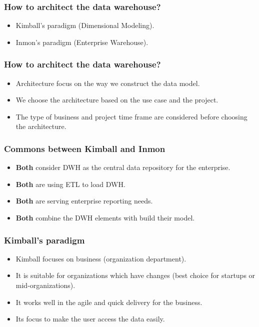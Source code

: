 \begin{frame}
	\frametitle{How to architect the data warehouse?}
	\begin{itemize}[<+->]
		\item Kimball's paradigm (Dimensional Modeling).
		\item Inmon's paradigm (Enterprise Warehouse).
	\end{itemize}
\end{frame}
\begin{frame}
	\frametitle{How to architect the data warehouse? }
	\begin{itemize}[<+->]
	\item Architecture focus on the way we construct the data model.
	\item We choose the architecture based on the use case and the project.
	\item The type of business and project time frame are considered before choosing the architecture. 
\end{itemize}
	
\end{frame}
\begin{frame}
	\frametitle{Commons between Kimball and Inmon}
		\begin{itemize}[<+->]
		\item \textbf{Both} consider DWH as the central data repository for the enterprise.
		\item \textbf{Both} are using ETL to load DWH.
		\item \textbf{Both} are serving enterprise reporting needs.
		\item \textbf{Both} combine the DWH elements with build their model.
	\end{itemize}

\end{frame}
\begin{frame}
	\frametitle{Kimball's paradigm}
	\begin{itemize}[<+->]
		\item Kimball focuses on business (organization department).
		\item It is suitable for organizations which have changes (best choice for startups or mid-organizations).
		\item It works well in the agile and quick delivery for the business.
		\item Its focus to make the user access the data easily.
	\end{itemize}
	
\end{frame}

